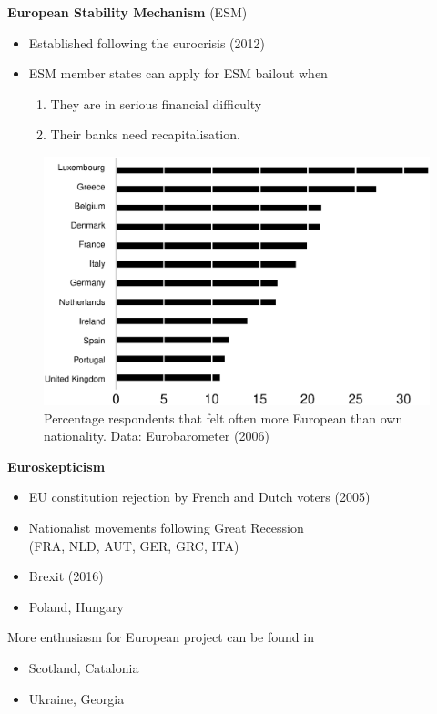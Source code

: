 \documentclass{beamer}
\begin{document}
\begin{frame}
 \textbf{European Stability Mechanism} (ESM)
   \begin{itemize}
    \item Established following the eurocrisis (2012)
    \item ESM member states can apply for ESM bailout when 
    \begin{enumerate}
      \item They are in serious financial difficulty
      \item Their banks need recapitalisation. 
    \end{enumerate}
  \end{itemize}       
\end{frame}


\begin{frame}
  \begin{figure}
    \includegraphics[scale=.35]{eurobarometer.eps}
    \\  \medskip
    Percentage respondents that felt  often more European than own nationality. Data: Eurobarometer (2006)
  \end{figure}
\end{frame}

\begin{frame}
  \textbf{Euroskepticism}
  \begin{itemize}
    \item EU constitution rejection by French and Dutch voters (2005)
    \item Nationalist movements following Great Recession\\ (FRA, NLD, AUT, GER, GRC, ITA) 
    \item Brexit (2016)
    \item Poland, Hungary
  \end{itemize}
  \medskip
  More enthusiasm for European project can be found in   
  \begin{itemize}
    \item Scotland, Catalonia
    \item Ukraine, Georgia
  \end{itemize}
\end{frame}
\end{document}
